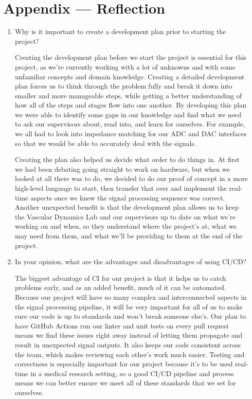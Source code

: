 \documentclass{article}
\begin{document}
\section*{Appendix --- Reflection}


% 

\begin{enumerate}
    \item Why is it important to create a development plan prior to starting the
    project?

    Creating the development plan before we start the project is essential for
    this project, as we're currently working with a lot of unknowns and with
    some unfamiliar concepts and domain knowledge. Creating a detailed
    development plan forces us to think through the problem fully and break it
    down into smaller and more manageable steps, while getting a better
    understanding of how all of the steps and stages flow into one another. By
    developing this plan we were able to identify some gaps in our knowledge
    and find what we need to ask our supervisors about, read into, and learn for
    ourselves. For example, we all had to look into impedance matching for our
    ADC and DAC interfaces so that we would be able to accurately deal with the
    signals.

    Creating the plan also helped us decide what order to do things in. At
    first we had been debating going straight to work on hardware, but when we
    looked at all there was to do, we decided to do our proof of concept in a
    more high-level language to start, then transfer that over and implement the
    real-time aspects once we knew the signal processing sequence was correct.
    Another unexpected benefit is that the development plan allows us to keep
    the Vascular Dynamics Lab and our supervisors up to date on what we're
    working on and when, so they understand where the project's at, what we may
    need from them, and what we'll be providing to them at the end of the
    project.

    \item In your opinion, what are the advantages and disadvantages of using
    CI/CD?

    The biggest advantage of CI for our project is that it helps us to catch
    problems early, and as an added benefit, much of it can be automated.
    Because our project will have so many complex and interconnected aspects in
    the signal processing pipeline, it will be very important for all of us to
    make sure our code is up to standards and won't break someone else's. Our
    plan to have GitHub Actions run our linter and unit tests on every pull
    request means we find these issues right away instead of letting them
    propagate and result in unexpected signal outputs. It also keeps our code
    consistent across the team, which makes reviewing each other's work much
    easier. Testing and correctness is especially important for our project
    because it's to be used real-time in a medical research setting, so a good
    CI/CD pipeline and process means we can better ensure we meet all of these
    standards that we set for ourselves.


\end{enumerate}
\end{document}
